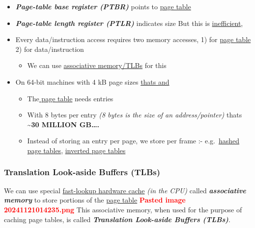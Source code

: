 \begin{itemize}
\tightlist
\item
  \textbf{\textit{Page-table base register (PTBR)}} points to \ul{page
  table}
\item
  \textbf{\textit{Page-table length register (PTLR)}} indicates size But
  this is \ul{inefficient},
\item
  Every data/instruction access requires two memory accesses, 1) for
  \ul{page table} 2) for data/instruction

  \begin{itemize}
  \tightlist
  \item
    We can use \ul{associative memory/TLBs} for this
  \end{itemize}
\item
  On 64-bit machines with 4 kB page sizes \ul{thats
   and }

  \begin{itemize}
  \tightlist
  \item
    The\ul{ page table} needs  entries
  \item
    With 8 bytes per entry \textit{(8 bytes is the size of an
    address/pointer)} thats \textbf{\textasciitilde30 MILLION GB\ldots.}
  \item
    Instead of storing an entry per page, we store per frame :-
    e.g.~\ul{hashed page tables}, \ul{inverted page tables}
  \end{itemize}
\end{itemize}

\subsubsection*{Translation Look-aside Buffers (TLBs)}

We can use special \ul{fast-lookup hardware cache} \textit{(in the CPU)}
called \textbf{\textit{associative memory}} to store portions of the
\ul{page table}
\textcolor{red}{\textbf{Pasted image 20241121014235.png}} This
associative memory, when used for the purpose of caching page tables, is
called \textbf{\textit{Translation Look-aside Buffers (TLBs)}}.

